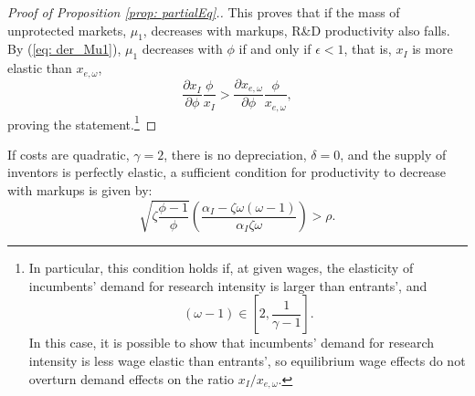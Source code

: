 \begin{proof}[Proof of Proposition \ref{prop: partialEq}.]
This proves that if the mass of unprotected markets, $\mu_{1}$, decreases
with markups, R\&D productivity also falls. By (\ref{eq: der_Mu1}),
$\mu_{1}$ decreases with $\phi$ if and only if $\epsilon<1$, that
is, $x_{I}$ is more elastic than $x_{e,\omega}$,
\[
\frac{\partial x_{I}}{\partial\phi}\frac{\phi}{x_{I}}>\frac{\partial x_{e,\omega}}{\partial\phi}\frac{\phi}{x_{e,\omega}},
\]
proving the statement.\footnote{In particular, this condition holds if, at given wages, the elasticity
of incumbents' demand for research intensity is larger than entrants',
and 
\[
(\omega-1)\in\left[2,\frac{1}{\gamma-1}\right].
\]
 In this case, it is possible to show that incumbents' demand for
research intensity is less wage elastic than entrants', so equilibrium
wage effects do not overturn demand effects on the ratio $x_{I}/x_{e,\omega}.$} 
\end{proof}
%
\begin{cor}
\label{cor: parameters}If costs are quadratic, $\gamma=2$, there
is no depreciation, $\delta=0$, and the supply of inventors is perfectly
elastic, a sufficient condition for productivity to decrease with
markups is given by:
\[
\sqrt{\zeta\frac{\phi-1}{\phi}}\left(\frac{\alpha_{I}-\zeta\omega\left(\omega-1\right)}{\alpha_{I}\zeta\omega}\right)>\rho.
\]
\end{cor}
